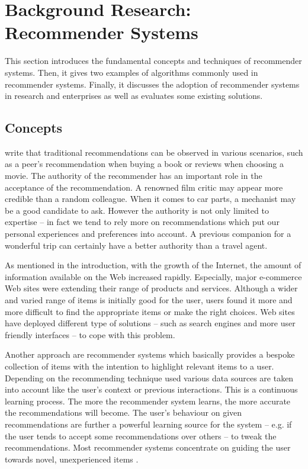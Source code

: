 \chapter{Background Research: Recommender Systems}

This section introduces the fundamental concepts and techniques of recommender systems. Then, it gives two examples of algorithms commonly used in recommender systems. Finally, it discusses the adoption of recommender systems in research and enterprises as well as evaluates some existing solutions.

\section{Concepts}

\citet{ricci11} write that traditional recommendations can be observed in various scenarios, such as a peer's recommendation when buying a book or reviews when choosing a movie. The authority of the recommender has an important role in the acceptance of the recommendation. A renowned film critic may appear more credible than a random colleague. When it comes to car parts, a mechanist may be a good candidate to ask. However the authority is not only limited to expertise -- in fact we tend to rely more on recommendations which put our personal experiences and preferences into account. A previous companion for a wonderful trip can certainly have a better authority than a travel agent.

As mentioned in the introduction, with the growth of the Internet, the amount of information available on the Web increased rapidly. Especially, major e-commerce Web sites were extending their range of products and services. Although a wider and varied range of items is initially good for the user, users found it more and more difficult to find the appropriate items or make the right choices. Web sites have deployed different type of solutions -- such as search engines and more user friendly interfaces -- to cope with this problem.

Another approach are recommender systems which basically provides a bespoke collection of items with the intention to highlight relevant items to a user. Depending on the recommending technique used various data sources are taken into account like the user's context or previous interactions. This is a continuous learning process. The more the recommender system learns, the more accurate the recommendations will become. The user's behaviour on given recommendations are further a powerful learning source for the system -- e.g. if the user tends to accept some recommendations over others -- to tweak the recommendations. Most recommender systems concentrate on guiding the user towards novel, unexperienced items \cite{herlocker04}.



